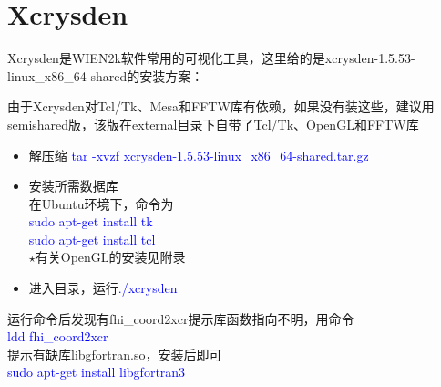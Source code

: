 \documentclass{article}      %
\begin{document}


\section{Xcrysden}
\textrm{Xcrysden}是\textrm{WIEN2k}软件常用的可视化工具，这里给的是\textrm{xcrysden-1.5.53-linux\_x86\_64-shared}的安装方案：

由于\textrm{Xcrysden}对\textrm{Tcl/Tk}、\textrm{Mesa}和\textrm{FFTW}库有依赖，如果没有装这些，建议用\textrm{semishared}版，该版在\textrm{external}目录下自带了\textrm{Tcl/Tk}、\textrm{OpenGL}和\textrm{FFTW}库
\begin{itemize}
	\item 解压缩 \textcolor{blue}{tar\; -xvzf\; xcrysden-1.5.53-linux\_x86\_64-shared.tar.gz}
	\item 安装所需数据库\\
		在\textrm{Ubuntu}环境下，命令为\\
		\textcolor{blue}{sudo\; apt-get\; install tk}\\
		\textcolor{blue}{sudo\; apt-get\; install tcl}\\
		$\star$有关\textrm{OpenGL}的安装见附录 
	\item 进入目录，运行\textcolor{blue}{./xcrysden}
\end{itemize}

运行命令后发现有\textrm{fhi\_coord2xcr}提示库函数指向不明，用命令\\
\textcolor{blue}{ldd\; fhi\_coord2xcr}\\
提示有缺库\textrm{libgfortran.so}，安装后即可\\
\textcolor{blue}{sudo\; apt-get\; install\; libgfortran3}
\end{document}
